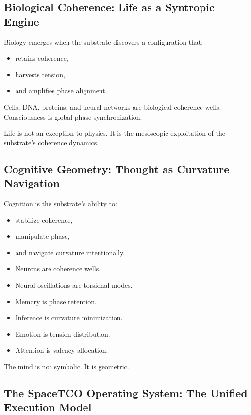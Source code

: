 \documentclass[reprint,amsmath,amssymb,aps,prl,floatfix]{revtex4-2}
\begin{document}
\begin{itemize}
\subsection{Biological Coherence: Life as a Syntropic Engine}

Biology emerges when the substrate discovers a configuration that:

\begin{itemize}
\item retains coherence,  
\item harvests tension,  
\item and amplifies phase alignment.
\end{itemize}
\medskip

Cells, DNA, proteins, and neural networks are biological coherence wells.  
Consciousness is global phase synchronization.
\medskip

Life is not an exception to physics.  
It is the mesoscopic exploitation of the substrate’s coherence dynamics.

\subsection{Cognitive Geometry: Thought as Curvature Navigation}

Cognition is the substrate’s ability to:

\begin{itemize}
\item stabilize coherence,  
\item manipulate phase,  
\item and navigate curvature intentionally.
\end{itemize}

\medskip
\begin{itemize}
\item Neurons are coherence wells.
\item Neural oscillations are torsional modes.  
\item Memory is phase retention.  
\item Inference is curvature minimization.  
\item Emotion is tension distribution.  
\item Attention is valency allocation.
\end{itemize}

The mind is not symbolic.  
It is geometric.

\subsection{The SpaceTCO Operating System: The Unified Execution Model}


\end{itemize}
\end{document}
